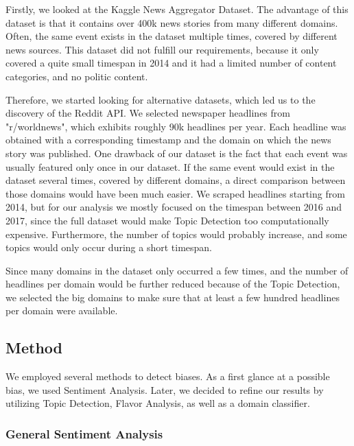\documentclass[final]{ieee}
\begin{document}
Firstly, we looked at the Kaggle News Aggregator Dataset\cite{Lichman13}. The advantage of this dataset is that it contains over 400k news stories from many different domains. Often, the same event exists in the dataset multiple times, covered by different news sources.
This dataset did not fulfill our requirements, because it only covered a quite small timespan in 2014 and it had a limited number of content categories, and no politic content.

Therefore, we started looking for alternative datasets, which led us to the discovery of the Reddit API. We selected newspaper headlines from "r/worldnews", which exhibits roughly 90k headlines per year. Each headline was obtained with a corresponding timestamp and the domain on which the news story was published. One drawback of our dataset is the fact that each event was usually featured only once in our dataset. If the same event would exist in the dataset several times, covered by different domains, a direct comparison between those domains would have been much easier. We scraped headlines starting from 2014, but for our analysis we mostly focused on the timespan between 2016 and 2017, since the full dataset would make Topic Detection too computationally expensive. Furthermore, the number of topics would probably increase, and some topics would only occur during a short timespan.

Since many domains in the dataset only occurred a few times, and the number of headlines per domain would be further reduced because of the Topic Detection, we selected the big domains to make sure that at least a few hundred headlines per domain were available.

\subsection{Method}\label{sec:method}


We employed several methods to detect biases. As a first glance at a possible bias, we used Sentiment Analysis. Later, we decided to refine our results by utilizing Topic Detection, Flavor Analysis, as well as a domain classifier.

\subsubsection{General Sentiment Analysis}\label{sec:general sentiment}
\end{document}
